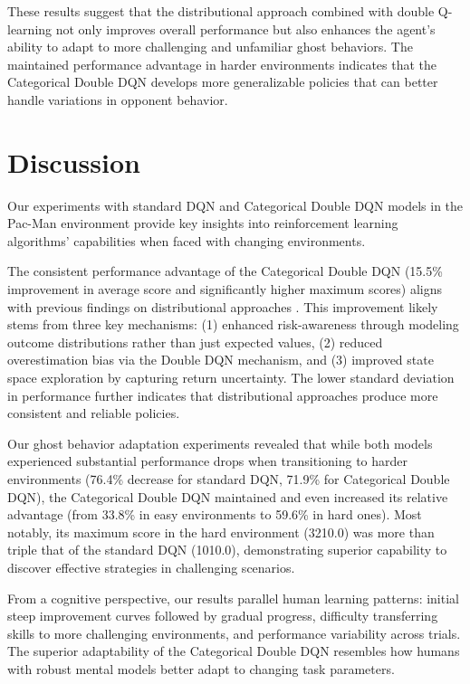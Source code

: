 \documentclass{article} %
\begin{document}
These results suggest that the distributional approach combined with double Q-learning not only improves overall performance but also enhances the agent's ability to adapt to more challenging and unfamiliar ghost behaviors. The maintained performance advantage in harder environments indicates that the Categorical Double DQN develops more generalizable policies that can better handle variations in opponent behavior.


\section{Discussion}

Our experiments with standard DQN and Categorical Double DQN models in the Pac-Man environment provide key insights into reinforcement learning algorithms' capabilities when faced with changing environments.

The consistent performance advantage of the Categorical Double DQN (15.5\% improvement in average score and significantly higher maximum scores) aligns with previous findings on distributional approaches \cite{bellemare2017distributional}. This improvement likely stems from three key mechanisms: (1) enhanced risk-awareness through modeling outcome distributions rather than just expected values, (2) reduced overestimation bias via the Double DQN mechanism, and (3) improved state space exploration by capturing return uncertainty. The lower standard deviation in performance further indicates that distributional approaches produce more consistent and reliable policies.

Our ghost behavior adaptation experiments revealed that while both models experienced substantial performance drops when transitioning to harder environments (76.4\% decrease for standard DQN, 71.9\% for Categorical Double DQN), the Categorical Double DQN maintained and even increased its relative advantage (from 33.8\% in easy environments to 59.6\% in hard ones). Most notably, its maximum score in the hard environment (3210.0) was more than triple that of the standard DQN (1010.0), demonstrating superior capability to discover effective strategies in challenging scenarios.

From a cognitive perspective, our results parallel human learning patterns: initial steep improvement curves followed by gradual progress, difficulty transferring skills to more challenging environments, and performance variability across trials. The superior adaptability of the Categorical Double DQN resembles how humans with robust mental models better adapt to changing task parameters.
\end{document}
